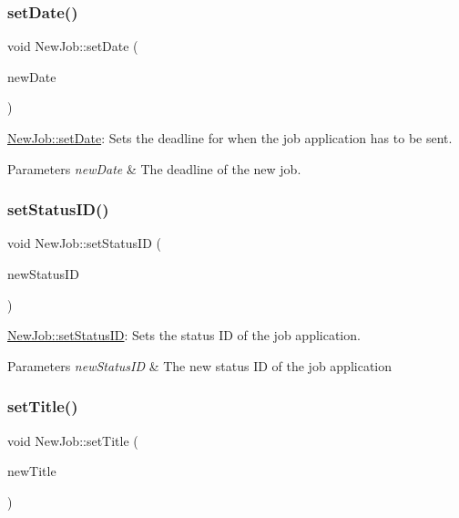 \subsubsection{\texorpdfstring{set\+Date()}{setDate()}}
{\footnotesize\ttfamily void New\+Job\+::set\+Date (\begin{DoxyParamCaption}\item[{Q\+String}]{new\+Date }\end{DoxyParamCaption})}



\hyperlink{class_new_job_a0a1d9067e72f797ad3b1f01d44fedb0f}{New\+Job\+::set\+Date}\+: Sets the deadline for when the job application has to be sent. 


\begin{DoxyParams}{Parameters}
{\em new\+Date} & The deadline of the new job. \\
\hline
\end{DoxyParams}
\mbox{\label{class_new_job_aa184d2046d0e60e82cd5840c40b99bed}} 
\subsubsection{\texorpdfstring{set\+Status\+I\+D()}{setStatusID()}}
{\footnotesize\ttfamily void New\+Job\+::set\+Status\+ID (\begin{DoxyParamCaption}\item[{int}]{new\+Status\+ID }\end{DoxyParamCaption})}



\hyperlink{class_new_job_aa184d2046d0e60e82cd5840c40b99bed}{New\+Job\+::set\+Status\+ID}\+: Sets the status ID of the job application. 


\begin{DoxyParams}{Parameters}
{\em new\+Status\+ID} & The new status ID of the job application \\
\hline
\end{DoxyParams}
\mbox{\label{class_new_job_ae8c2b576f2ea6f444776e6d944f0d767}} 
\subsubsection{\texorpdfstring{set\+Title()}{setTitle()}}
{\footnotesize\ttfamily void New\+Job\+::set\+Title (\begin{DoxyParamCaption}\item[{Q\+String}]{new\+Title }\end{DoxyParamCaption})}



